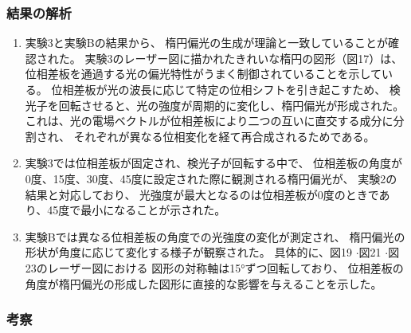 \documentclass{article}
\begin{document}
\subsubsection*{結果の解析}
\begin{spacing}{1.2}
    \begin{enumerate}[label=\arabic*), before=\begin{spacing}{1.2}, after=\end{spacing}] %
    \item 
    実験3と実験Bの結果から、
    楕円偏光の生成が理論と一致していることが確認された。
    実験3のレーザー図に描かれたきれいな楕円の図形（図17）は、
    位相差板を通過する光の偏光特性がうまく制御されていることを示している。
    位相差板が光の波長に応じて特定の位相シフトを引き起こすため、
    検光子を回転させると、光の強度が周期的に変化し、楕円偏光が形成された。
    これは、光の電場ベクトルが位相差板により二つの互いに直交する成分に分割され、
    それぞれが異なる位相変化を経て再合成されるためである。

    \item 
    実験3では位相差板が固定され、検光子が回転する中で、
    位相差板の角度が0度、15度、30度、45度に設定された際に観測される楕円偏光が、
    実験2の結果と対応しており、
    光強度が最大となるのは位相差板が0度のときであり、45度で最小になることが示された。
    
    \item 
    実験Bでは異なる位相差板の角度での光強度の変化が測定され、
    楕円偏光の形状が角度に応じて変化する様子が観察された。
    具体的に、図19 $\cdot$図21 $\cdot$図23のレーザー図における
    図形の対称軸は15°ずつ回転しており、
    位相差板の角度が楕円偏光の形成した図形に直接的な影響を与えることを示した。
    \end{enumerate}
\end{spacing}

\subsubsection{考察}
\end{document}
